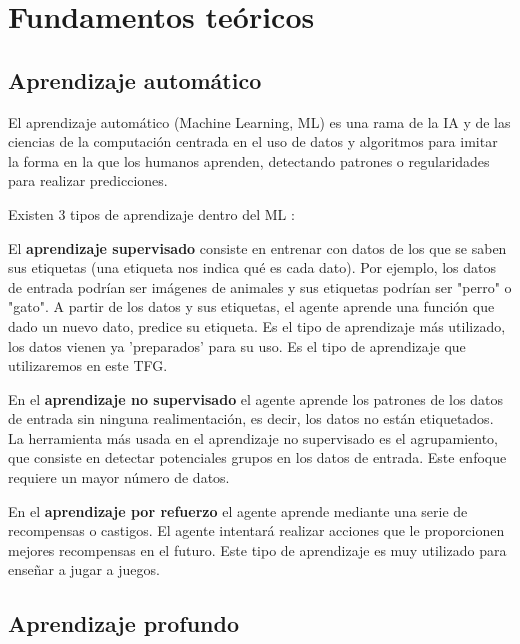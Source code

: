 \chapter{Fundamentos teóricos}
\thispagestyle{empty}

\section{Aprendizaje automático}
El aprendizaje automático (Machine Learning, ML) \cite{16,17} es una rama de la IA y de las ciencias de la computación centrada en el uso de datos y algoritmos para imitar la forma en la que los humanos aprenden, detectando patrones o regularidades para realizar predicciones.

Existen 3 tipos de aprendizaje dentro del ML \cite{18,19}:

El \textbf{aprendizaje supervisado} consiste en entrenar con datos de los que se saben sus etiquetas (una etiqueta nos indica qué es cada dato). Por ejemplo, los datos de entrada podrían ser imágenes de animales y sus etiquetas podrían ser "perro" o "gato". A partir de los datos y sus etiquetas, el agente aprende una función que dado un nuevo dato, predice su etiqueta. Es el tipo de aprendizaje más utilizado, los datos vienen ya 'preparados' para su uso. Es el tipo de aprendizaje que utilizaremos en este TFG.

En el \textbf{aprendizaje no supervisado} el agente aprende los patrones de los datos de entrada sin ninguna realimentación, es decir, los datos no están etiquetados. La herramienta más usada en el aprendizaje no supervisado es el agrupamiento, que consiste en detectar potenciales grupos en los datos de entrada. Este enfoque requiere un mayor número de datos.

En el \textbf{aprendizaje por refuerzo} el agente aprende mediante una serie de recompensas o castigos. El agente intentará realizar acciones que le proporcionen mejores recompensas en el futuro. Este tipo de aprendizaje es muy utilizado para enseñar a jugar a juegos.

\section{Aprendizaje profundo}

